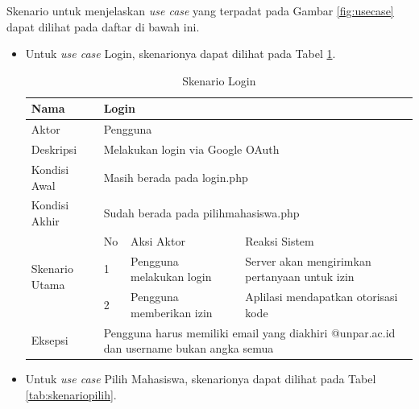 Skenario untuk menjelaskan {\it use case} yang terpadat pada Gambar \ref{fig:usecase}
dapat dilihat pada daftar di bawah ini.
\begin{itemize}
\item Untuk {\it use case} Login, skenarionya dapat dilihat pada Tabel
\ref{tab:skenariologin}.

\begin{table}[ht]
\centering
\caption[Tabel Skenario Login]{Skenario Login}
\label{tab:skenariologin}
\begin{tabular}{|p{1.4cm}|p{0.4cm}|p{2cm}|p{2cm}|p{2cm}|p{2cm}|}
\hline
Nama & \multicolumn{5}{p{8cm}|}{Login} \\ \hline
Aktor & \multicolumn{5}{p{8cm}|}{Pengguna} \\ \hline
Deskripsi & \multicolumn{5}{p{8cm}|}{Melakukan login via Google OAuth} \\ \hline
Kondisi Awal & \multicolumn{5}{p{8cm}|}{Masih berada pada login.php} \\ \hline
Kondisi Akhir & \multicolumn{5}{p{8cm}|}{Sudah berada pada pilihmahasiswa.php}
\\ \hline
\multirow{3}{*}{\parbox{1.4cm}{Skenario Utama}} & No &
\multicolumn{2}{p{4cm}|}{Aksi Aktor} & \multicolumn{2}{p{4cm}|}{Reaksi Sistem}
\\ \cline{2-6}
& 1 & \multicolumn{2}{p{4cm}|}{Pengguna melakukan login} &
\multicolumn{2}{p{4cm}|}{Server akan mengirimkan pertanyaan untuk izin} \\
\cline{2-6} & 2 & \multicolumn{2}{p{4cm}|}{Pengguna memberikan izin} &
\multicolumn{2}{p{4cm}|}{Aplilasi mendapatkan otorisasi kode} \\ \hline
Eksepsi & \multicolumn{5}{p{8cm}|}{Pengguna harus memiliki email yang diakhiri
@unpar.ac.id dan username bukan angka semua} \\ \hline
\end{tabular}
\end{table}

\item Untuk {\it use case} Pilih Mahasiswa, skenarionya dapat dilihat pada Tabel
\ref{tab:skenariopilih}.


\end{itemize}
